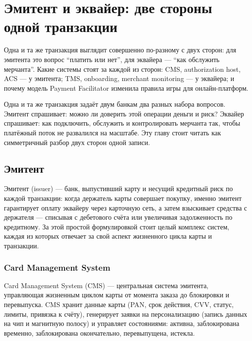 \chapter{Эмитент и эквайер: две стороны одной транзакции}
\label{ch:issuer-acquirer}
\margintoc


\begin{kaobox}[title=Что вы узнаете из этой главы]
  Одна и та же транзакция выглядит совершенно по-разному с двух
  сторон: для эмитента это вопрос \enquote{платить или нет},
  для эквайера — \enquote{как обслужить мерчанта}. Какие системы
  стоят за каждой из сторон: CMS, authorization host, ACS —
  у эмитента; TMS, onboarding, merchant monitoring —
  у эквайера; и почему модель Payment Facilitator изменила
  правила игры для онлайн-платформ.
\end{kaobox}

Одна и та же транзакция задаёт двум банкам два разных набора
вопросов. Эмитент спрашивает: можно ли доверить этой операции
деньги и риск? Эквайер спрашивает: как подключить, обслужить
и контролировать мерчанта так, чтобы платёжный поток не развалился
на масштабе. Эту главу стоит читать как симметричный разбор двух
сторон одной записи.

\section{Эмитент}
\label{sec:ia-issuer}

Эмитент (issuer) — банк, выпустивший карту и несущий кредитный
риск по каждой транзакции: когда держатель карты совершает
покупку, именно эмитент гарантирует оплату эквайеру через
карточную сеть, а затем взыскивает средства с держателя —
списывая с дебетового счёта или увеличивая задолженность
по кредитному. За этой простой формулировкой стоит целый комплекс
систем, каждая из которых отвечает за свой аспект жизненного
цикла карты и транзакции.

\subsection*{Card Management System}

Card Management System (CMS) — центральная система эмитента, управляющая жизненным циклом карты от момента заказа до
блокировки и перевыпуска. CMS хранит данные карты (PAN, срок действия, CVV, статус, лимиты, привязка к счёту),
генерирует заявки на персонализацию (запись данных на чип и магнитную полосу) и управляет состояниями: активна,
заблокирована временно, заблокирована окончательно, перевыпущена, истекла.


